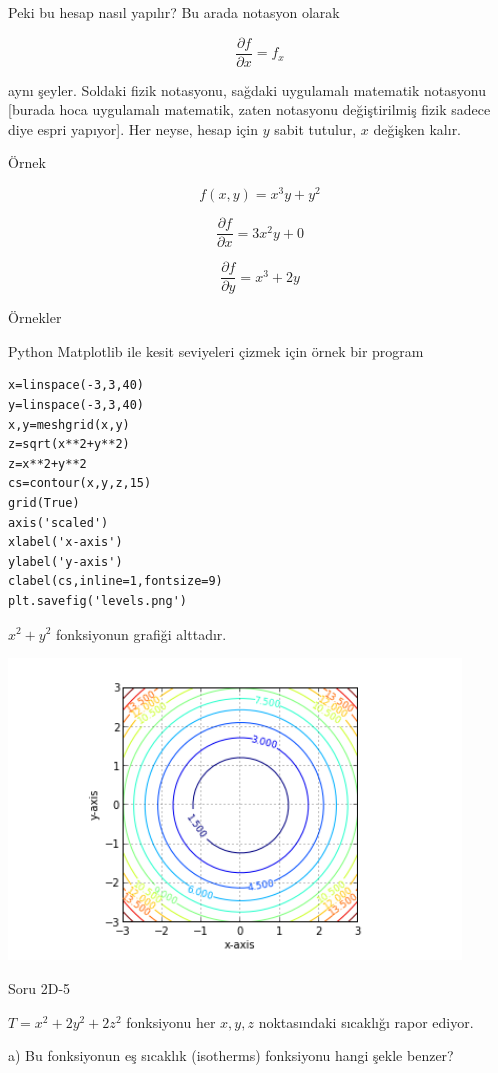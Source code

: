 \documentclass[12pt,fleqn]{article}\usepackage{../../common}
\begin{document}
Peki bu hesap nasıl yapılır? Bu arada notasyon olarak 

$$ \frac{\partial f}{\partial x} = f_x $$

aynı şeyler. Soldaki fizik notasyonu, sağdaki uygulamalı matematik
notasyonu [burada hoca uygulamalı matematik, zaten notasyonu değiştirilmiş
fizik sadece diye espri yapıyor]. Her neyse, hesap için $y$ sabit tutulur,
$x$ değişken kalır. 

Örnek

$$ f(x,y) = x^3y  + y^2 $$

$$ \frac{\partial f}{\partial x} = 3x^2y + 0$$

$$ \frac{\partial f}{\partial y} = x^3 + 2y$$

Örnekler 

Python Matplotlib ile kesit seviyeleri çizmek için örnek bir program

\begin{verbatim}
x=linspace(-3,3,40)
y=linspace(-3,3,40)
x,y=meshgrid(x,y)
z=sqrt(x**2+y**2)
z=x**2+y**2
cs=contour(x,y,z,15)
grid(True)
axis('scaled')
xlabel('x-axis')
ylabel('y-axis')
clabel(cs,inline=1,fontsize=9)
plt.savefig('levels.png')
\end{verbatim}

$x^2+y^2$ fonksiyonun grafiği alttadır. 

\begin{center}
\includegraphics[height=8cm]{levels.png}
\end{center}

Soru 2D-5

$T = x^2 + 2y^2 + 2z^2$ fonksiyonu her $x,y,z$ noktasındaki sıcaklığı rapor
ediyor. 

a) Bu fonksiyonun eş sıcaklık (isotherms) fonksiyonu hangi şekle benzer?
\end{document}
